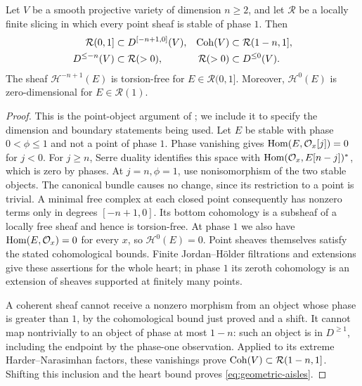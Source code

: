 \begin{lemma}\label{lem:geometric-range}
Let $V$ be a smooth projective variety of dimension $n\ge2$, and let
$\mathcal R$ be a locally finite slicing in which every point sheaf is
stable of phase $1$.  Then
\begin{align}
 \mathcal R(0,1]&\subset D^{[-n+1,0]}(V),
 &\operatorname{Coh}(V)&\subset\mathcal R(1-n,1],\label{eq:geometric-range}\\
 D^{\le-n}(V)&\subset\mathcal R(>0),
 &\mathcal R(>0)&\subset D^{\le0}(V).\label{eq:geometric-aisles}
\end{align}
The sheaf $\mathcal H^{-n+1}(E)$ is torsion-free for
$E\in\mathcal R(0,1]$.  Moreover, $\mathcal H^0(E)$ is zero-dimensional
for $E\in\mathcal R(1)$.
\end{lemma}

\begin{proof}
This is the point-object argument of \cite[Lemma~10.1]{BridgelandK3}; we
include it to specify the dimension and boundary statements being used.
Let $E$ be stable with phase $0<\phi\le1$ and not a point of phase $1$.
Phase vanishing gives $\operatorname{Hom}(E,\mathcal O_x[j])=0$ for $j<0$.
For $j\ge n$, Serre duality identifies this space with
$\operatorname{Hom}(\mathcal O_x,E[n-j])^*$, which is zero by phases.  At $j=n,\phi=1$, use
nonisomorphism of the two stable objects.  The canonical bundle causes no
change, since its restriction to a point is trivial.  A minimal free
complex at each closed point consequently has nonzero terms only in
degrees $[-n+1,0]$.  Its bottom cohomology is a subsheaf of a locally free
sheaf and hence is torsion-free.  At phase $1$ we also have
$\operatorname{Hom}(E,\mathcal O_x)=0$ for every $x$, so $\mathcal H^0(E)=0$.
Point sheaves themselves satisfy the stated cohomological bounds.  Finite
Jordan--Hölder filtrations and extensions give these assertions for the whole
heart; in phase $1$ its zeroth cohomology is an extension of sheaves supported
at finitely many points.

A coherent sheaf cannot receive a nonzero morphism from an object whose
phase is greater than $1$, by the cohomological bound just proved and a
shift.  It cannot map nontrivially to an object of phase at most $1-n$:
such an object is in $D^{\ge1}$, including the endpoint by the phase-one
observation.  Applied to its extreme Harder--Narasimhan factors, these
vanishings prove $\operatorname{Coh}(V)\subset\mathcal R(1-n,1]$.  Shifting this
inclusion and the heart bound proves \eqref{eq:geometric-aisles}.
\end{proof}

